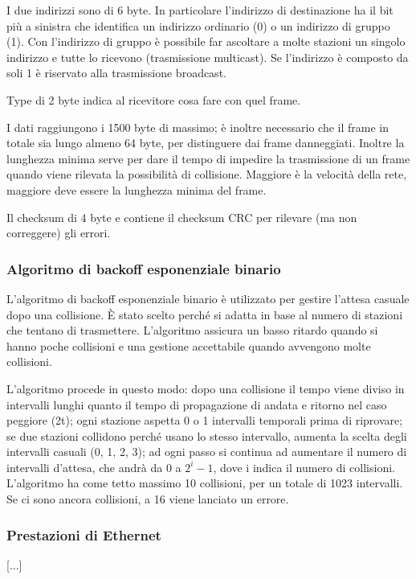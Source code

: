I due indirizzi sono di 6 byte. In particolare l'indirizzo di destinazione ha il bit più a sinistra che identifica un indirizzo ordinario (0) o un indirizzo di gruppo (1).
Con l'indirizzo di gruppo è possibile far ascoltare a molte stazioni un singolo indirizzo e tutte lo ricevono (trasmissione multicast).
Se l'indirizzo è composto da soli 1 è riservato alla trasmissione broadcast.

Type di 2 byte indica al ricevitore cosa fare con quel frame.

I dati raggiungono i 1500 byte di massimo; è inoltre necessario che il frame in totale sia lungo almeno 64 byte, per distinguere dai frame danneggiati.
Inoltre la lunghezza minima serve per dare il tempo di impedire la trasmissione di un frame quando viene rilevata la possibilità di collisione.
Maggiore è la velocità della rete, maggiore deve essere la lunghezza minima del frame.

Il checksum di 4 byte e contiene il checksum CRC per rilevare (ma non correggere) gli errori.

\subsubsection{Algoritmo di backoff esponenziale binario}
L'algoritmo di backoff esponenziale binario è utilizzato per gestire l'attesa casuale dopo una collisione. 
\`E stato scelto perché si adatta in base al numero di stazioni che tentano di trasmettere.
L'algoritmo assicura un basso ritardo quando si hanno poche collisioni e una gestione accettabile quando avvengono molte collisioni. 

L'algoritmo procede in questo modo: 
dopo una collisione il tempo viene diviso in intervalli lunghi quanto il tempo di propagazione di andata e ritorno nel caso peggiore (2t);
ogni stazione aspetta 0 o 1 intervalli temporali prima di riprovare;
se due stazioni collidono perché usano lo stesso intervallo, aumenta la scelta degli intervalli casuali (0, 1, 2, 3);
ad ogni passo si continua ad aumentare il numero di intervalli d'attesa, che andrà da 0 a $2^i-1$, dove i indica il numero di collisioni.
L'algoritmo ha come tetto massimo 10 collisioni, per un totale di 1023 intervalli. Se ci sono ancora collisioni, a 16 viene lanciato un errore.

\subsubsection{Prestazioni di Ethernet}
[...]

